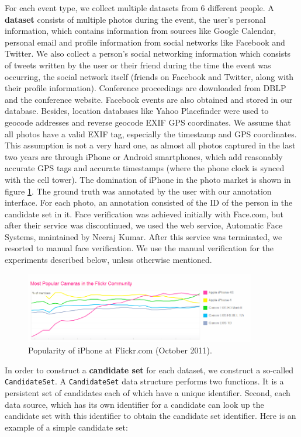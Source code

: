 For each event type, we collect multiple datasets from 6 different people. A \textbf{dataset} consists of multiple photos during the event, the user's personal information, which contains information from sources like Google Calendar, personal email and profile information from social networks like Facebook and Twitter. We also collect a person's social networking information which consists of tweets written by the user or their friend during the time the event was occurring, the social network itself (friends on Facebook and Twitter, along with their profile information). Conference proceedings are downloaded from DBLP and the conference website. Facebook events are also obtained and stored in our database. Besides, location databases like Yahoo Placefinder were used to geocode addresses and reverse geocode EXIF GPS coordinates. We assume that all photos have a valid EXIF tag, especially the timestamp and GPS coordinates. This assumption is not a very hard one, as almost all photos captured in the last two years are through iPhone or Android smartphones, which add reasonably accurate GPS tags and accurate timestamps (where the phone clock is synced with the cell tower). The domination of iPhone in the photo market is shown in figure \ref{fig:flickr-camera-popularity}. The ground truth was annotated by the user with our annotation interface. For each photo, an annotation consisted of the ID of the person in the candidate set in it. Face verification was achieved initially with Face.com, but after their service was discontinued, we used the web service, Automatic Face Systems, maintained by Neeraj Kumar. After this service was terminated, we resorted to manual face verification. We use the manual verification for the experiments described below, unless otherwise mentioned.

\begin{figure}[t]
\centering
\includegraphics[width=0.9\textwidth]{media/flickr-camera-popularity.png}
\caption{Popularity of iPhone at Flickr.com (October 2011).}
\label{fig:flickr-camera-popularity}
\end{figure}

In order to construct a \textbf{candidate set} for each dataset, we construct a so-called \texttt{CandidateSet}. A \texttt{CandidateSet} data structure performs two functions. It is a persistent set of candidates each of which have a unique identifier. Second, each data source, which has its own identifier for a candidate can look up the candidate set with this identifier to obtain the candidate set identifier. Here is an example of a simple candidate set:

